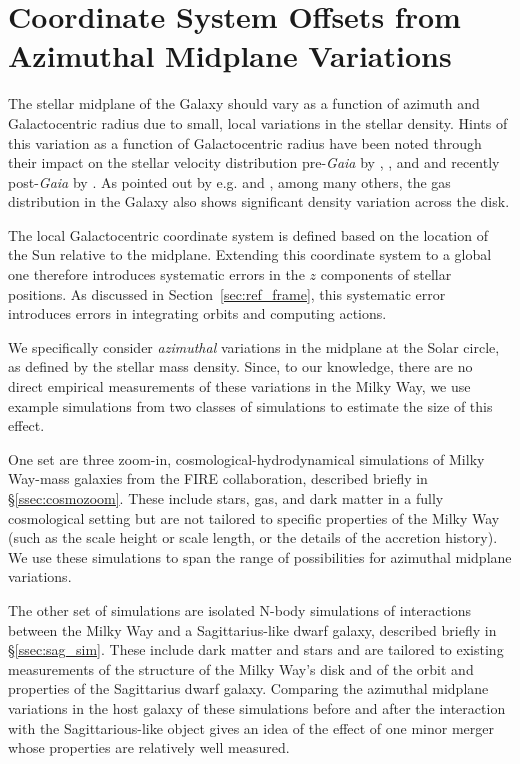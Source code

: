 \documentclass[twocolumn]{aastex62}
\begin{document}
\section{Coordinate System Offsets from Azimuthal Midplane Variations}
\label{sec:local_fire}

The stellar midplane of the Galaxy should vary as a function of azimuth and
Galactocentric radius due to small, local variations in the stellar density.
Hints of this variation as a function of Galactocentric radius have been noted
through their impact on the stellar velocity distribution pre-\emph{Gaia} by
\citet{2012ApJ...750L..41W}, \citet{2013ApJ...777L...5C}, and
\citet{2013MNRAS.436..101W} and recently post-\emph{Gaia} by
\citet{2019arXiv190209569F}. As pointed out by e.g.
\citet{2014ApJ...797...53G} and \citet{2019ApJ...871..145A}, among many
others, the gas distribution in the Galaxy also shows significant density
variation across the disk.

The local Galactocentric coordinate system is defined based on the location of
the Sun relative to the midplane. Extending this coordinate system to a global
one therefore introduces systematic errors in the $z$ components of stellar
positions. As discussed in Section~\ref{sec:ref_frame}, this systematic error
introduces errors in integrating orbits and computing actions.

We specifically consider \emph{azimuthal} variations in the midplane at the Solar circle, as defined by the stellar mass density. Since, to our knowledge, there are no direct empirical measurements of these variations in the Milky Way, we use example simulations from two classes of simulations to estimate the size of this effect. 

One set are three zoom-in, cosmological-hydrodynamical simulations of Milky Way-mass galaxies from the FIRE collaboration, described briefly in \S \ref{ssec:cosmozoom}. These include stars, gas, and dark matter in a fully cosmological setting but are not tailored to specific properties of the Milky Way (such as the scale height or scale length, or the details of the accretion history). We use these simulations to span the range of possibilities for azimuthal midplane variations.

The other set of simulations are isolated N-body simulations of interactions between the Milky Way and a Sagittarius-like dwarf galaxy, described briefly in \S \ref{ssec:sag_sim}. These include dark matter and stars and are tailored to existing measurements of the structure of the Milky Way's disk and of the orbit and properties of the Sagittarius dwarf galaxy. Comparing the azimuthal midplane variations in the host galaxy of these simulations before and after the interaction with the Sagittarious-like object gives an idea of the effect of one minor merger whose properties are relatively well measured.
\end{document}
